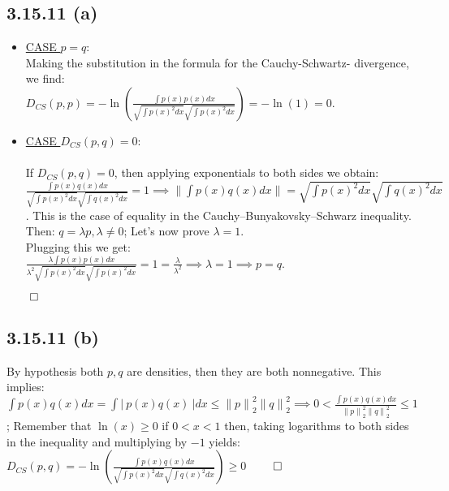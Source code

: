 \documentclass{exam}
\renewenvironment{proof}{{\noindent\itshape\ignorespaces}}{{\hfill$\qed$\\}}
\begin{document}
\subsection*{3.15.11 (a)}
\begin{proof}  
    \begin{itemize}
        \item \underline{CASE $p=q$}:\newline
        \\
        Making the substitution in the formula for the Cauchy-Schwartz- divergence, we find:\\
        $D_{CS}(p,p) = -\ln(\displaystyle\frac{\int p(x) p(x) d x}{\sqrt{\int p(x)^2 d x } \sqrt{\int p(x)^2 d x }}) = - \ln(1) = 0.$
        \item \underline{CASE $D_{CS}(p,q) = 0$}:\\
        \\
        If $D_{CS}(p,q) = 0$, then applying exponentials to both sides we obtain:\newline
        $\displaystyle\frac{\displaystyle \int p(x) q(x) d x}{\sqrt{\displaystyle\int p(x)^2 d x } \sqrt{\displaystyle\int q(x)^2 d x }} = 1 \implies \lVert \displaystyle\int p(x) q(x) d x \lVert = \sqrt{\displaystyle \int p(x)^2 d x } \sqrt{\displaystyle \int q(x)^2 d x }$. This is the case of equality in
        the Cauchy–Bunyakovsky–Schwarz inequality. Then: $q = \lambda p, \lambda \neq 0$; Let's now prove $\lambda = 1$.
        \\
        Plugging this we get: \\
        $\displaystyle\frac{\displaystyle \lambda \int p(x) p(x) d x}{\lambda^{2} \sqrt{\displaystyle\int p(x)^2 d x } \sqrt{\displaystyle\int p(x)^2 d x }} = 1 = \frac{\lambda}{\lambda^{2}} \implies \lambda  = 1 \implies p = q.$
    \end{itemize}  
\end{proof}

\subsection*{3.15.11 (b)}
By hypothesis both $p, q$ are densities, then they are both nonnegative. This implies: \\

\begin{proof} 
    $\displaystyle \int p(x) q(x) d x  = \displaystyle \int \left| \ p(x) q(x) \ \right| d x \leq  {\lVert p \lVert}^{2}_{2} {\lVert q \lVert}^{2}_{2} \implies 0 < \displaystyle\frac{\displaystyle \int p(x) q(x) d x}{{\lVert p \lVert}^{2}_{2} {\lVert q \lVert}^{2}_{2}} \leq 1$; Remember that $\ln(x) \geq 0 $ if $0<x<1$ then, taking logarithms to both sides in the inequality and
    multiplying by $-1$ yields:\\
    $D_{CS}(p,q) = -\ln(\displaystyle \frac{\displaystyle \int p(x) q(x) d x }{\displaystyle\sqrt{\int p(x)^2 d x } \displaystyle\sqrt{\int q(x)^2 d x }}) \geq 0$
\end{proof} 
\end{document}

